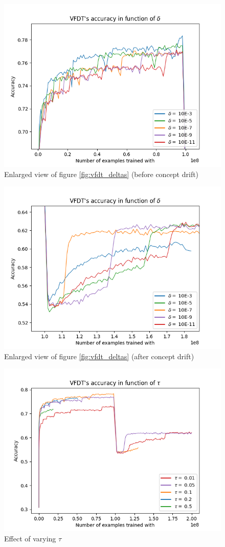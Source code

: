 \documentclass[12pt]{article}
\begin{document}
\begin{figure}
	\centering
	\includegraphics[width=.8\linewidth]{./img/vfdt_delta_zoom2.png}
	\caption{Enlarged view of figure \ref{fig:vfdt_deltas} (before concept drift)}
	\label{fig:vfdt_delta_zoom}	
\end{figure}
\begin{figure}
	\centering
	\includegraphics[width=.8\linewidth]{./img/vfdt_delta_zoom.png}
	\caption{Enlarged view of figure \ref{fig:vfdt_deltas} (after concept drift)}
	\label{fig:vfdt_delta_zoom2}	
\end{figure}
\begin{figure}
	\centering
	\includegraphics[width=.8\linewidth]{./img/vfdt_taus.png}
	\caption{Effect of varying $\tau$}
	\label{fig:vfdt_taus}	
\end{figure}
\end{document}
